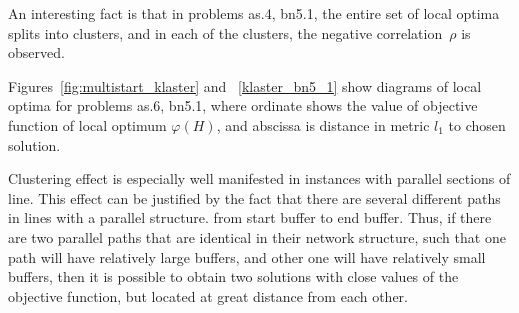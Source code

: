 \documentclass{ifacconf}
\begin{document}
An interesting fact is 
that in problems as.4, bn5.1, the entire set of local optima splits
into clusters, and in each of the clusters, the negative correlation~$\rho$ is observed.

Figures~\ref{fig:multistart_klaster} and ~\ref{klaster_bn5_1} show diagrams of local optima for problems
as.6, bn5.1, where ordinate shows the value of objective function of local optimum $\varphi(H)$, and abscissa is
distance in metric $l_1$ to chosen solution.

Clustering effect is especially well manifested in instances with parallel sections of line.
This effect can be justified by the  fact that there are several different paths in lines with a parallel structure.
from start buffer to end buffer. Thus, if there are two parallel paths that are identical in their network structure,
such that one path will have relatively large buffers, and other one will have relatively small buffers, then 
it is possible to obtain two solutions with close values of the objective function, but located at great distance from each other.
\end{document}
